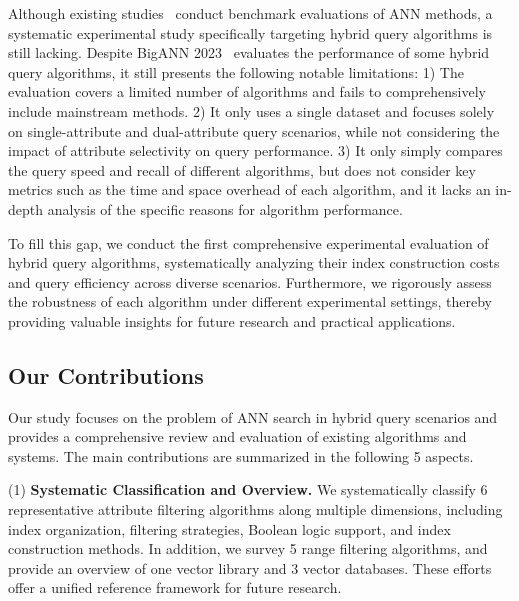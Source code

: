\documentclass[sigconf, nonacm, pdfa]{acmart}
\begin{document}
Although existing studies~\cite{compare,compare2} conduct benchmark evaluations of ANN methods, a systematic experimental study specifically targeting hybrid query algorithms is still lacking. Despite BigANN 2023~\cite{bigann2023} evaluates the performance of some hybrid query algorithms, it still presents the following notable limitations:
	1) The evaluation covers a limited number of algorithms and fails to comprehensively include mainstream methods.
	2) It only uses a single dataset and focuses solely on single-attribute and dual-attribute query scenarios, while not considering the impact of attribute selectivity on query performance.
	3) It only simply compares the query speed and recall of different algorithms, but does not consider key metrics such as the time and space overhead of each algorithm, and it lacks an in-depth analysis of the specific reasons for algorithm performance.
	
To fill this gap, we conduct the first comprehensive experimental evaluation of hybrid query algorithms, systematically analyzing their index construction costs and query efficiency across diverse scenarios. Furthermore, we rigorously assess the robustness of each algorithm under different experimental settings, thereby providing valuable insights for future research and practical applications.
	

	\subsection{Our Contributions}
	
	Our study focuses on the problem of ANN search in hybrid query scenarios and provides a comprehensive review and evaluation of existing algorithms and systems. The main contributions are summarized in the following 5 aspects.
	
	(1)\textbf{ Systematic Classification and Overview.}
	We systematically classify 6 representative attribute filtering algorithms along multiple dimensions, including index organization, filtering strategies, Boolean logic support, and index construction methods. In addition, we survey 5 range filtering algorithms, and provide an overview of one vector library and 3 vector databases. These efforts offer a unified reference framework for future research.
\end{document}
